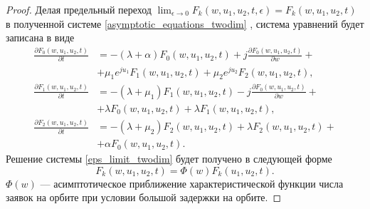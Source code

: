 \begin{proof}
	Делая предельный переход $ \lim_{\epsilon \xrightarrow{} 0} F_{k}(w,u_{1},u_{2},t,\epsilon) = F_{k}(w,u_{1},u_{2},t)$  в полученной системе \eqref{asymptotic_equations_twodim} , система уравнений будет записана в виде
	\begin{equation} \label{eps_limit_twodim}
		\begin{split}
			\frac{{\partial F_{0}(w,u_{1},u_{2},t)}}{{\partial t}} &= -(\lambda + \alpha)F_{0}(w,u_{1},u_{2},t) + j
			\frac{{\partial F_{0}(w,u_{1},u_{2},t)}}{{\partial w}} +\\  &+ \mu_{1} e^{ju_{1}}F_{1}(w,u_{1},u_{2},t) + \mu_{2}e^{ju_{2}}F_{2}(w,u_{1},u_{2},t) ,
			\\
			\frac{{\partial F_{1}(w,u_{1},u_{2},t)}}{{\partial t}} &= -(\lambda + \mu_{1})F_{1}(w,u_{1},u_{2},t) - j 
			\frac{{\partial F_{0}(w,u_{1},u_{2},t)}}{{\partial w}} +\\  &+ \lambda F_{0}(w,u_{1},u_{2},t) + \lambda F_{1}(w,u_{1},u_{2},t) ,
			\\
			\frac{{\partial F_{2}(w,u_{1},u_{2},t)}}{{\partial t}} &= -(\lambda + \mu_{2})F_{2}(w,u_{1},u_{2},t)  + \lambda F_{2}(w,u_{1},u_{2},t) +\\  &+ \alpha F_{0}(w,u_{1},u_{2},t).
		\end{split}
	\end{equation}  
	Решение системы \eqref{eps_limit_twodim} будет получено в следующей форме
	\begin{equation} \label{solution_twodim}
		F_{k}(w,u_{1},u_{2},t) = \Phi(w)F_{k}(u_{1},u_{2},t).
	\end{equation}  
	$\Phi(w)$ --- асимптотическое приближение характеристической функции числа заявок на орбите при условии большой задержки на орбите.
	

\end{proof}
